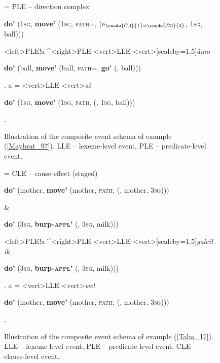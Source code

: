\begin{figure}


\jtree[xunit=9.5em,yunit=2em]
\! = {PLE -- direction complex}{\begin{scriptsize}\textbf{do'} (1\textsc{sg}, \textbf{move'} (1\textsc{sg}, \textsc{path=}, \textbf{} (e$_{\rnode{C3}{1}=\rnode{B3}{2}}$, 1\textsc{sg}, ball)))\end{scriptsize}}
<left>{PLE}!a ^<right>{PLE}
<vert>{LLE}
<vert>[scaleby=1.5]{\textit{àmo}}{\begin{scriptsize} \textbf{do'} (ball, \textbf{move'} (ball, \textsc{path=}, \textbf{go'} (, ball)))\end{scriptsize}}.
\!a = <vert>{LLE}
<vert>{\textit{ai}}
{\begin{scriptsize} \textbf{do'} (1\textsc{sg}, \textbf{move'} (1\textsc{sg}, \textsc{path}, \textbf{} (, 1\textsc{sg}, ball)))\end{scriptsize}}.
\endjtree


\caption[Event schema illustration of example (\ref{Maybrat_97})]{Illustration of the composite event schema of example (\ref{Maybrat_97}). LLE -- lexeme-level event, PLE -- predicate-level event.}
\label{figure:eventschema_Maybrat97}
\end{figure}


\begin{figure}


\jtree[xunit=9.5em,yunit=2em]
\! = {CLE -- cause-effect (staged)}{\begin{scriptsize} \textbf{do'} (mother, \textbf{move'} (mother, \textsc{path}, \textbf{} (, mother, 3\textsc{sg})))\end{scriptsize} \&}
{\begin{scriptsize} \textbf{do'} (3\textsc{sg}, \textbf{burp-\textsc{appl}'} (, 3\textsc{sg}, milk)))\end{scriptsize}}
<left>{PLE}!a ^<right>{PLE}
<vert>{LLE}
<vert>[scaleby=1.5]{\textit{galeit-ik}}{\begin{scriptsize} \textbf{do'} (3\textsc{sg}, \textbf{burp-\textsc{appl}'} (, 3\textsc{sg}, milk)))\end{scriptsize}}.
\!a = <vert>{LLE}
<vert>{\textit{wet}}
{\begin{scriptsize} \textbf{do'} (mother, \textbf{move'} (mother, \textsc{path}, \textbf{} (, mother, 3\textsc{sg})))\end{scriptsize}}.
\endjtree


\caption[Event schema illustration of example (\ref{Taba_17})]{Illustration of the composite event schema of example (\ref{Taba_17}). LLE -- lexeme-level event, PLE -- predicate-level event, CLE -- clause-level event.}
\label{figure:eventschema_Taba17}
\end{figure}


